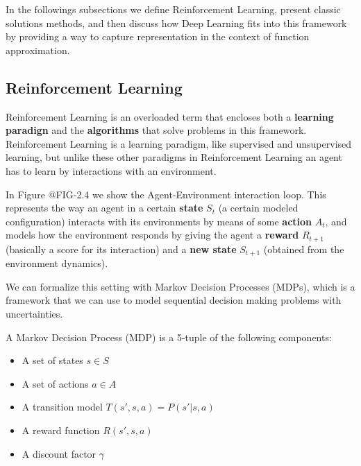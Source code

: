 \figdrlsamplesFirst

\figdrlsamplesSecond

\figdrlsamplesThird

In the followings subsections we define Reinforcement Learning, present classic solutions methods, and then
discuss how Deep Learning fits into this framework by providing a way to capture representation
in the context of function approximation.

\subsection{Reinforcement Learning}

Reinforcement Learning is an overloaded term that encloses both a \textbf{learning paradign}
and the \textbf{algorithms} that solve problems in this framework. Reinforcement Learning 
is a learning paradigm, like supervised and unsupervised learning, but unlike these other paradigms  
in Reinforcement Learning an agent has to learn by interactions with an environment.

In Figure @FIG-2.4 we show the Agent-Environment interaction loop. This represents
the way an agent in a certain \textbf{state} $S_{t}$ (a certain modeled configuration) interacts 
with its environments by means of some \textbf{action} $A_{t}$, and models how the environment 
responds by giving the agent a \textbf{reward} $R_{t+1}$ (basically a score for its interaction) 
and a \textbf{new state} $S_{t+1}$ (obtained from the environment dynamics).

\figrlloop

We can formalize this setting with Markov Decision Processes (MDPs), which is a framework
that we can use to model sequential decision making problems with uncertainties.

\begin{definition}
    A Markov Decision Process (MDP) is a 5-tuple of the following components:
    \begin{itemize}
        \item A set of states $s \in S$
        \item A set of actions $a \in A$
        \item A transition model $T(s',s,a) = P(s'|s,a)$
        \item A reward function $R(s',s,a)$
        \item A discount factor $\gamma$
    \end{itemize}
\end{definition}

